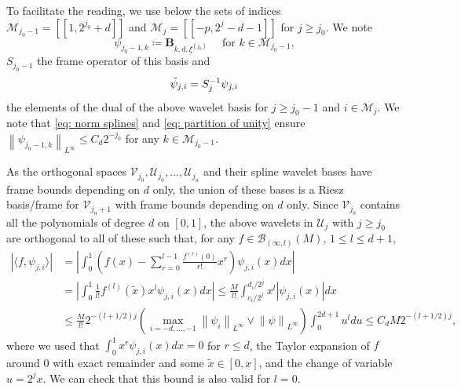 \documentclass[preprint]{imsart}
\newcommand\norm[1]{\left\lVert#1\right\rVert}
\numberwithin{equation}{section}
\begin{document}
To facilitate the reading, we use below the sets of indices $\mathcal{M}_{j_0-1}=[\![ 1,2^{j_0}+d]\!]$ and $\mathcal{M}_{j}=[\![ -p,2^{j}-d-1]\!]$ for $j\geq j_0$. We note \begin{equation}\label{eq: notation spline wav}\psi_{j_0-1,k}\coloneqq \mathbf{B}_{k,d,\xi^{(j_0)}}\quad\text{ for $k\in \mathcal{M}_{j_0-1}$,}\end{equation}$S_{j_0-1}$ the frame operator of this basis and \begin{equation}\label{eq: notation dual spline}\Tilde{\psi}_{j,i}= S_j^{-1} \psi_{j,i}\end{equation} the elements of the dual of the above wavelet basis for $j\geq j_0-1$ and $i\in \mathcal{M}_{j}$. We note that \eqref{eq: norm splines} and \eqref{eq: partition of unity} ensure $\norm{\psi_{j_0-1,k}}_{L^\infty}\leq C_d 2^{-j_0}$ for any $k\in \mathcal{M}_{j_0-1}$.

As the orthogonal spaces $\mathcal{V}_{j_0},\mathcal{U}_{j_0},\dots,\mathcal{U}_{j_n}$ and their spline wavelet bases have frame bounds depending on $d$ only, the union of these bases is a Riesz basis/frame for $\mathcal{V}_{j_n+1}$ with frame bounds depending on $d$ only. Since $\mathcal{V}_{j_0}$ contains all the polynomials of degree $d$ on $[0,1]$, the above wavelets in $\mathcal{U}_j$ with $j\geq j_0$ are orthogonal to all of these such that, for any $f \in \mathcal{B}_{(\infty,l)}(M)$, $1\leq l\leq d+1$,
\begin{align}\label{eq: decay spline wavelet coeff}
    \left|\langle f, \psi_{j,i}\rangle\right| &= \left|\int_0^1 \left(f(x)-\sum_{r=0}^{l-1}\frac{f^{(r)}(0)}{r!}x^r\right) \psi_{j,i}(x) dx\right|\nonumber\\
    &= \left|\int_0^1 \frac{1}{l!}f^{(l)}(\tilde{x})x^{l} \psi_{j,i}(x) dx\right|
    \leq \frac{M}{l!} \int_{c_i/2^j}^{d_i/2^j} x^{l} \left|\psi_{j,i}(x)\right| dx\nonumber\\
    &\leq \frac{M}{l!}2^{-(l+1/2)j} \left(\max_{i=-d,\dots,-1} \norm{\psi_i}_{L^\infty} \vee \norm{\psi}_{L^\infty}\right) \int_0^{2d+1} u^l du  \leq C_d M 2^{-(l+1/2)j},
\end{align}
where we used that $\int_0^1 x^r \psi_{j,i}(x) dx=0$ for $r\leq d$, the Taylor expansion of $f$ around $0$ with exact remainder and some $\tilde{x}\in[0,x]$, and the change of variable $u=2^jx$. We can check that this bound is also valid for $l=0$.
\end{document}
